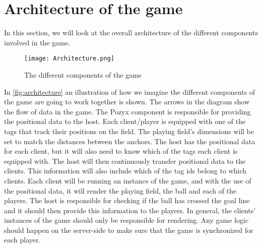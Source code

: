 \section{Architecture of the game}
In this section, we will look at the overall architecture of the different components involved in the game.
\begin{figure}[H]
    \centering
    \texttt{[image: Architecture.png]}
    \caption{The different components of the game}
    \label{fig:architecture}
\end{figure}
\noindent
In \autoref{fig:architecture} an illustration of how we imagine the different components of the game are going to work together is shown.
The arrows in the diagram show the flow of data in the game.
The Pozyx component is responsible for providing the positional data to the host. 
Each client/player is equipped with one of the tags that track their positions on the field. 
The playing field's dimensions will be set to match the distances between the anchors. 
The host has the positional data for each client, but it will also need to know which of the tags each client is equipped with.
The host will then continuously transfer positional data to the clients.
This information will also include which of the tag ids belong to which clients.
Each client will be running an instance of the game, and with the use of the positional data, it will render the playing field, the ball and each of the players.
The host is responsible for checking if the ball has crossed the goal line and it should then provide this information to the players.
In general, the clients' instances of the game should only be responsible for rendering.
Any game logic should happen on the server-side to make sure that the game is synchronized for each player. 

